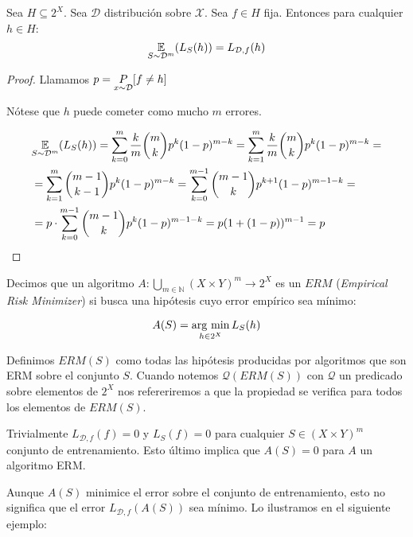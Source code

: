 \begin{fact}
Sea $H\subseteq 2^X$. Sea $\mathcal{D}$ distribución sobre $\mathcal{X}$. Sea $f \in H$ fija. Entonces para
cualquier $h\in H$:
\[\underset{S\sim \mathcal{D}^m}{\mathbb{E}}(L_S(h)) = L_{\mathcal{D},f}(h)\]

\end{fact}

\begin{proof}
  Llamamos $p= \underset{x\sim \mathcal{D}}{P} [f\neq h]$

  Nótese que $h$ puede cometer como mucho $m$ errores.
  
  \begin{align*}
  & \underset{S\sim \mathcal{D}^m}{\mathbb{E}}(L_S(h)) = \sum_{k=0}^m \frac{k}{m} \binom{m}{k} p^k(1-p)^{m-k} = \sum_{k=1}^m \frac{k}{m} \binom{m}{k} p^k(1-p)^{m-k} =\\
  & = \sum_{k=1}^m \binom{m-1}{k-1} p^k(1-p)^{m-k} = \sum_{k=0}^{m-1} \binom{m-1}{k} p^{k+1}(1-p)^{m-1-k} = \\
  & = p\cdot \sum_{k=0}^{m-1} \binom{m-1}{k} p^{k}(1-p)^{m-1-k} = p(1+(1-p))^{m-1} = p
  \end{align*}
\end{proof}


\begin{definition}
Decimos que un algoritmo $A: \underset{m\in \mathbb{N}}{\bigcup} (X\times Y)^m \rightarrow 2^{X}$ es un $ERM$ 
(\textit{Empirical Risk Minimizer}) si busca una hipótesis cuyo error empírico sea mínimo:

\[A(S) = \operatorname*{arg\,\min}_{h\in 2^X} L_S(h)\]
\end{definition}

Definimos $ERM(S)$ como todas las hipótesis producidas por algoritmos que son ERM
sobre el conjunto $S$. Cuando notemos $\mathcal{Q}(ERM(S))$ con $\mathcal{Q}$ un predicado sobre elementos 
de $2^X$ nos refereriremos a que la propiedad se verifica para todos los elementos de $ERM(S)$.

Trivialmente $L_{\mathcal{D},f}(f) = 0$ y $L_S(f) = 0$ para cualquier $S \in (X \times Y)^m$ conjunto de entrenamiento.
Esto último implica que $A(S) = 0$ para $A$ un algoritmo ERM.

Aunque $A(S)$ minimice el error sobre el conjunto de entrenamiento, esto no significa que el error $L_{\mathcal{D},f} (A(S))$ 
sea mínimo. Lo ilustramos en el siguiente ejemplo:

